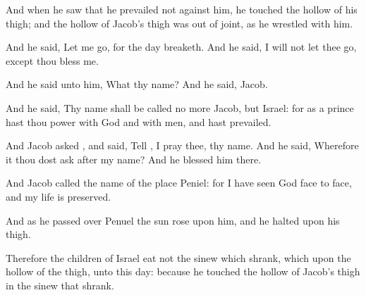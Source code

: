 {And when he
saw that he
prevailed not against him, he
touched the hollow of his
thigh; and the
hollow of
Jacob’s
thigh was out of
joint, as he
wrestled with him.

And he
said, Let me
go, for the
day
breaketh. And he
said, I will not let thee
go,
except thou
bless me.

And he
said unto him, What
{} thy
name? And he
said,
Jacob.

And he
said, Thy
name shall be
called no more
Jacob, but
Israel: for as a prince hast thou
power with
God and with
men, and hast
prevailed.

And
Jacob
asked
{}, and
said,
Tell
{}, I pray thee, thy
name. And he
said, Wherefore
{}
it
{} thou dost
ask after my
name? And he
blessed him there.

And
Jacob
called the
name of the
place
Peniel: for I have
seen
God
face to
face, and my
life is
preserved.

And as he passed
over
Penuel the
sun
rose upon him, and he
halted upon his
thigh.

Therefore the
children of
Israel
eat not
{} the
sinew which
shrank, which
{} upon the
hollow of the
thigh, unto this
day: because he
touched the
hollow of
Jacob’s
thigh in the
sinew that
shrank.




\par }
